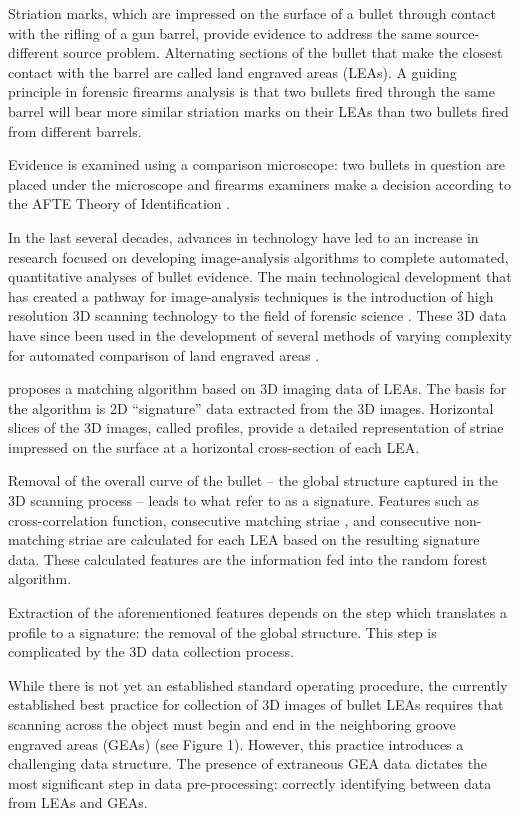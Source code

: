 \documentclass[12pt]{article}
\begin{document}
Striation marks, which are impressed on the surface of a bullet through
contact with the rifling of a gun barrel, provide evidence to address
the same source-different source problem. Alternating sections of the
bullet that make the closest contact with the barrel are called land
engraved areas (LEAs). A guiding principle in forensic firearms analysis
is that two bullets fired through the same barrel will bear more similar
striation marks on their LEAs than two bullets fired from different
barrels.

Evidence is examined using a comparison microscope: two bullets in
question are placed under the microscope and firearms examiners make a
decision according to the AFTE Theory of Identification \citep{AFTE}.

In the last several decades, advances in technology have led to an
increase in research focused on developing image-analysis algorithms to
complete automated, quantitative analyses of bullet evidence. The main
technological development that has created a pathway for image-analysis
techniques is the introduction of high resolution 3D scanning technology
to the field of forensic science
\citep[e.g.][]{DeKinder1, DeKinder2, Bachrach1}. These 3D data have
since been used in the development of several methods of varying
complexity for automated comparison of land engraved areas
\citep[e.g.][]{Ma1, Chu1, Chu2, Hare1}.

\citet{Hare1} proposes a matching algorithm based on 3D imaging data of
LEAs. The basis for the algorithm is 2D ``signature'' data extracted
from the 3D images. Horizontal slices of the 3D images, called profiles,
provide a detailed representation of striae impressed on the surface at
a horizontal cross-section of each LEA.

Removal of the overall curve of the bullet -- the global structure
captured in the 3D scanning process -- leads to what \citet{Hare1} refer
to as a signature. Features such as cross-correlation function,
consecutive matching striae \citep[see][]{Biasotti}, and consecutive
non-matching striae are calculated for each LEA based on the resulting
signature data. These calculated features are the information fed into
the random forest algorithm.

Extraction of the aforementioned features depends on the step which
translates a profile to a signature: the removal of the global
structure. This step is complicated by the 3D data collection process.

While there is not yet an established standard operating procedure, the
currently established best practice for collection of 3D images of
bullet LEAs requires that scanning across the object must begin and end
in the neighboring groove engraved areas (GEAs) (see Figure 1). However,
this practice introduces a challenging data structure. The presence of
extraneous GEA data dictates the most significant step in data
pre-processing: correctly identifying between data from LEAs and GEAs.
\end{document}
